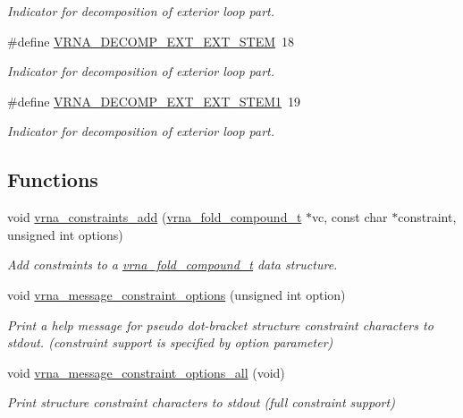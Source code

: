\begin{DoxyCompactItemize}
\begin{DoxyCompactList}\small\item\em Indicator for decomposition of exterior loop part. \end{DoxyCompactList}\item 
\#define \hyperlink{group__constraints_ga06efd054c9271438f6d82d4559d9e69f}{V\+R\+N\+A\+\_\+\+D\+E\+C\+O\+M\+P\+\_\+\+E\+X\+T\+\_\+\+E\+X\+T\+\_\+\+S\+T\+EM}~18
\begin{DoxyCompactList}\small\item\em Indicator for decomposition of exterior loop part. \end{DoxyCompactList}\item 
\#define \hyperlink{group__constraints_ga2e75d7a77118735b32f25422d9686719}{V\+R\+N\+A\+\_\+\+D\+E\+C\+O\+M\+P\+\_\+\+E\+X\+T\+\_\+\+E\+X\+T\+\_\+\+S\+T\+E\+M1}~19
\begin{DoxyCompactList}\small\item\em Indicator for decomposition of exterior loop part. \end{DoxyCompactList}\end{DoxyCompactItemize}
\subsection*{Functions}
\begin{DoxyCompactItemize}
\item 
void \hyperlink{group__constraints_ga35a401f680969a556858a8dd5f1d07cc}{vrna\+\_\+constraints\+\_\+add} (\hyperlink{group__fold__compound_ga1b0cef17fd40466cef5968eaeeff6166}{vrna\+\_\+fold\+\_\+compound\+\_\+t} $\ast$vc, const char $\ast$constraint, unsigned int options)
\begin{DoxyCompactList}\small\item\em Add constraints to a \hyperlink{group__fold__compound_ga1b0cef17fd40466cef5968eaeeff6166}{vrna\+\_\+fold\+\_\+compound\+\_\+t} data structure. \end{DoxyCompactList}\item 
void \hyperlink{group__constraints_gaa1f20b53bf09ac2e6b0dbb13f7d89670}{vrna\+\_\+message\+\_\+constraint\+\_\+options} (unsigned int option)
\begin{DoxyCompactList}\small\item\em Print a help message for pseudo dot-\/bracket structure constraint characters to stdout. (constraint support is specified by option parameter) \end{DoxyCompactList}\item 
void \hyperlink{group__constraints_gaec7e13fa0465c2acc7a621d1aecb709f}{vrna\+\_\+message\+\_\+constraint\+\_\+options\+\_\+all} (void)
\begin{DoxyCompactList}\small\item\em Print structure constraint characters to stdout (full constraint support) \end{DoxyCompactList}\end{DoxyCompactItemize}


